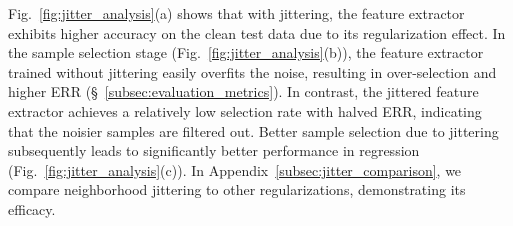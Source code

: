 \documentclass{article}
\def\ie{\textit{i.e}., } \def\Ie{\textit{I.e}., }
\theoremstyle{plain}
\theoremstyle{definition}
\theoremstyle{remark}
\begin{document}
Fig.~\ref{fig:jitter_analysis}(a) shows that with jittering, the feature extractor exhibits higher accuracy on the clean test data due to its regularization effect. 
In the sample selection stage (Fig.~\ref{fig:jitter_analysis}(b)), 
the feature extractor trained without jittering easily overfits the noise, resulting in over-selection and higher ERR (\S~\ref{subsec:evaluation_metrics}). 
In contrast, the jittered feature extractor achieves a relatively low selection rate with halved ERR, indicating that the noisier samples are filtered out.
Better sample selection due to jittering subsequently leads to significantly better performance in regression (Fig.~\ref{fig:jitter_analysis}(c)).
In Appendix~\ref{subsec:jitter_comparison}, we compare neighborhood jittering to other regularizations, demonstrating its efficacy.


\end{document}
